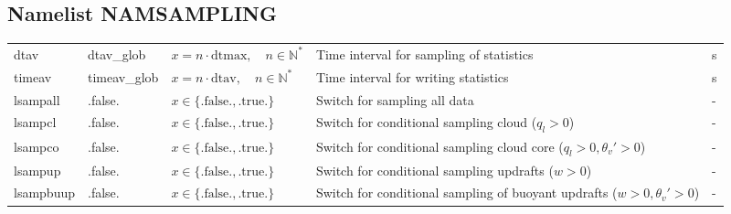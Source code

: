 \documentclass[twoside,11pt,fleqn,a4paper,english,openright]{report}
\begin{document}
\subsection{Namelist NAMSAMPLING}\label{par:sampling}
\begin{center}
  \tablelasttail{
        &&&&\\\hline
  }
\begin{supertabular}{|l|p{2cm}|p{4cm}|p{6cm}|l|}
  dtav		& dtav\_glob	& $x = n \cdot \text{dtmax}, \quad n \in \mathbb{N}^*$	& Time interval for sampling of statistics	& s\\
  timeav	& timeav\_glob	& $x = n \cdot \text{dtav}, \quad n \in \mathbb{N}^*$	& Time interval for writing statistics	& s\\
  lsampall      & .false.       & $x\in\{\text{.false.},\text{.true.}\}$        & Switch for sampling all data & -\\
  lsampcl	& .false.	& $x\in\{\text{.false.},\text{.true.}\}$	& Switch for conditional sampling cloud ($q_l > 0$)	& -\\
  lsampco	& .false.	& $x\in\{\text{.false.},\text{.true.}\}$	& Switch for conditional sampling cloud core ($q_l > 0,\theta_v' > 0$)	& -\\
  lsampup	& .false.	& $x\in\{\text{.false.},\text{.true.}\}$	& Switch for conditional sampling updrafts ($w > 0$)	& -\\
  lsampbuup	& .false.	& $x\in\{\text{.false.},\text{.true.}\}$	& Switch for conditional sampling of buoyant updrafts ($w > 0, \theta_v' > 0$)	& -\\
\end{supertabular}
\end{center}
\end{document}
